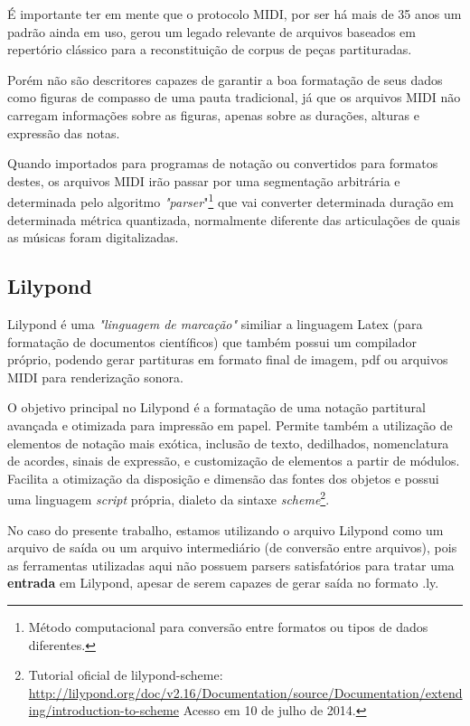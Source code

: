 \documentclass[
	12pt,				%
	openright,			%
	twoside,			%
	a4paper,			%
	english,			%
	french,				%
	spanish,			%
	brazil				%
	]{abntex2}
\begin{document}
É importante ter em mente que o protocolo MIDI, por ser há mais de 35 anos um padrão ainda em uso, gerou um legado relevante de arquivos baseados em repertório clássico para a reconstituição de corpus de peças partituradas. 

Porém não são descritores capazes de garantir a boa formatação de seus dados como figuras de compasso de uma pauta tradicional, já que os arquivos MIDI não carregam informações sobre as figuras, apenas sobre as durações, alturas e expressão das notas.

Quando importados para programas de notação ou convertidos para formatos destes, os arquivos MIDI irão passar por uma segmentação arbitrária e determinada pelo algoritmo \textit{"parser}"\footnote{Método computacional para conversão entre formatos ou tipos de dados diferentes.} que vai converter determinada duração em determinada métrica quantizada, normalmente diferente das articulações de quais as músicas foram digitalizadas.


\subsection{Lilypond}

Lilypond é uma  \textit{"linguagem de marcação"} similiar a linguagem Latex (para formatação de documentos científicos) que também possui um compilador próprio, podendo gerar partituras em formato final de imagem, pdf ou arquivos MIDI para renderização sonora.

O objetivo principal no Lilypond é a formatação de uma notação partitural avançada e otimizada para impressão em papel. Permite também a utilização de elementos de notação mais exótica, inclusão de texto, dedilhados, nomenclatura de acordes, sinais de expressão, e customização de elementos a partir de módulos. Facilita a otimização da disposição e dimensão das fontes dos objetos e possui uma linguagem \textit{script} própria, dialeto da sintaxe \textit{scheme}\footnote{Tutorial oficial de lilypond-scheme: \url{http://lilypond.org/doc/v2.16/Documentation/source/Documentation/extending/introduction-to-scheme} Acesso em 10 de julho de 2014.}.

No caso do presente trabalho, estamos utilizando o arquivo Lilypond como um arquivo de saída ou um arquivo intermediário (de conversão entre arquivos), pois as ferramentas utilizadas aqui não possuem parsers satisfatórios para tratar uma \textbf{entrada} em Lilypond, apesar de serem capazes de gerar saída no formato .ly.
\end{document}
